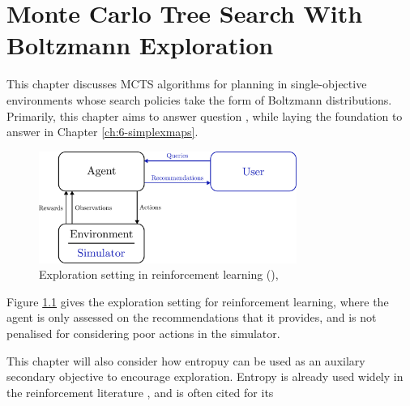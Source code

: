 

\chapter{\label{ch:4-dents}Monte Carlo Tree Search With Boltzmann Exploration} 

    \minitoc

    This chapter discusses MCTS algorithms for planning in single-objective environments whose search policies take the form of Boltzmann distributions. Primarily, this chapter aims to answer question \entropyq, while laying the foundation to answer \contextq\ewe in Chapter \ref{ch:6-simplexmaps}.
    
    \begin{figure}
        \centering\includegraphics[width=0.75\textwidth]{figures/ch2/rl_overview.pdf} 
        \caption[Exploration setting in reinforcement learning.]{ Exploration setting in reinforcement learning (), }
        \label{fig:4:rl_overview}
    \end{figure}

    Figure \ref{fig:4:rl_overview} gives the exploration setting for reinforcement learning, where the agent is only assessed on the recommendations that it provides, and is not penalised for considering poor actions in the simulator. 

    This chapter will also consider how entropuy can be used as an auxilary secondary objective to encourage exploration. Entropy is already used widely in the reinforcement literature , and is often cited for its  

